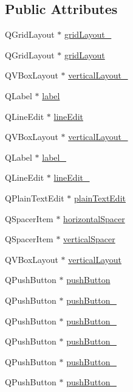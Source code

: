 \subsection*{Public Attributes}
\begin{CompactItemize}
\item 
QGridLayout $\ast$ \hyperlink{classUi__Form_20492753521a4e9bde7f68c0a760bc7d}{gridLayout\_}
\item 
QGridLayout $\ast$ \hyperlink{classUi__Form_ae98d1b7c9973f749fe480cf5eb2f7fc}{gridLayout}
\item 
QVBoxLayout $\ast$ \hyperlink{classUi__Form_7fe6aa5ca842136f57bc8d270d5242a0}{verticalLayout\_}
\item 
QLabel $\ast$ \hyperlink{classUi__Form_88987158471feff085512376ebfc3001}{label}
\item 
QLineEdit $\ast$ \hyperlink{classUi__Form_3a0c19a5e180e3638a6ca0ba1a63e80e}{lineEdit}
\item 
QVBoxLayout $\ast$ \hyperlink{classUi__Form_1b66aafcaf277c283656d8c690bd2ca5}{verticalLayout\_}
\item 
QLabel $\ast$ \hyperlink{classUi__Form_c36d14f305d7e061dddbefb10f1cc07f}{label\_}
\item 
QLineEdit $\ast$ \hyperlink{classUi__Form_88fc296e3e271e922aa5d1d1927db978}{lineEdit\_}
\item 
QPlainTextEdit $\ast$ \hyperlink{classUi__Form_719e0bdfecd5696d222b2ebe93cf0902}{plainTextEdit}
\item 
QSpacerItem $\ast$ \hyperlink{classUi__Form_a083de4d8d3e7bd048bee20ef99f2ea9}{horizontalSpacer}
\item 
QSpacerItem $\ast$ \hyperlink{classUi__Form_bfba4e1529538a2b814117392cbd4e01}{verticalSpacer}
\item 
QVBoxLayout $\ast$ \hyperlink{classUi__Form_292f20c0af9f15fa4da52b031b12eee1}{verticalLayout}
\item 
QPushButton $\ast$ \hyperlink{classUi__Form_283dc0cdd4294e215c6995077b7d75e3}{pushButton}
\item 
QPushButton $\ast$ \hyperlink{classUi__Form_633cc8e4e55d8ed211f30f3c21d3651a}{pushButton\_}
\item 
QPushButton $\ast$ \hyperlink{classUi__Form_1c8c527c351aa3ecb2b234e1fc300284}{pushButton\_}
\item 
QPushButton $\ast$ \hyperlink{classUi__Form_bb7ba76408930a3b6afba9a7d21dcd96}{pushButton\_}
\item 
QPushButton $\ast$ \hyperlink{classUi__Form_2f99ce32d1dcbc708ec777b866145ca7}{pushButton\_}
\item 
QPushButton $\ast$ \hyperlink{classUi__Form_1ed3e40afb137d161c21d75be0cfdb28}{pushButton\_}
\end{CompactItemize}


